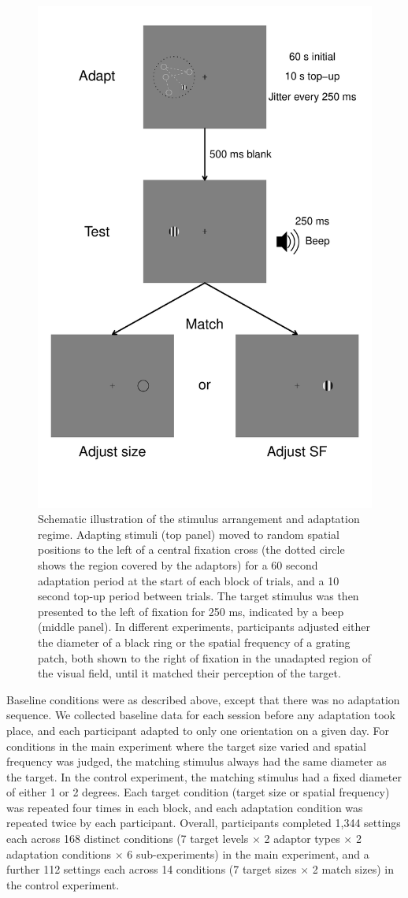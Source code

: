 \documentclass[
]{article}
\begin{document}
\begin{figure}

{\centering \includegraphics[width=0.5\linewidth]{Figures/Figure2} 

}

\caption{Schematic illustration of the stimulus arrangement and adaptation regime. Adapting stimuli (top panel) moved to random spatial positions to the left of a central fixation cross (the dotted circle shows the region covered by the adaptors) for a 60 second adaptation period at the start of each block of trials, and a 10 second top-up period between trials. The target stimulus was then presented to the left of fixation for 250 ms, indicated by a beep (middle panel). In different experiments, participants adjusted either the diameter of a black ring or the spatial frequency of a grating patch, both shown to the right of fixation in the unadapted region of the visual field, until it matched their perception of the target.}\label{fig:figure2}
\end{figure}

Baseline conditions were as described above, except that there was no adaptation sequence. We collected baseline data for each session before any adaptation took place, and each participant adapted to only one orientation on a given day. For conditions in the main experiment where the target size varied and spatial frequency was judged, the matching stimulus always had the same diameter as the target. In the control experiment, the matching stimulus had a fixed diameter of either 1 or 2 degrees. Each target condition (target size or spatial frequency) was repeated four times in each block, and each adaptation condition was repeated twice by each participant. Overall, participants completed 1,344 settings each across 168 distinct conditions (7 target levels \(\times\) 2 adaptor types \(\times\) 2 adaptation conditions \(\times\) 6 sub-experiments) in the main experiment, and a further 112 settings each across 14 conditions (7 target sizes \(\times\) 2 match sizes) in the control experiment.
\end{document}
